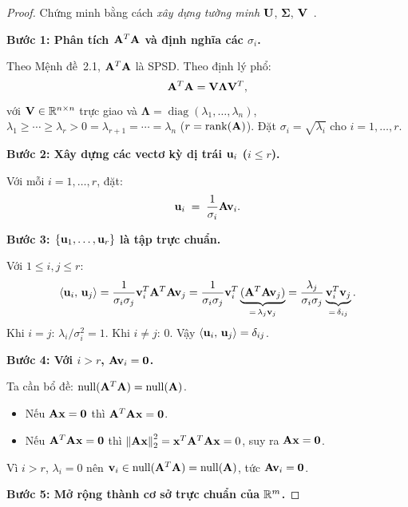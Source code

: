 \begin{proof}
Chứng minh bằng cách \emph{xây dựng tường minh} $\mathbf{U}$, $\boldsymbol{\Sigma}$,
$\mathbf{V}$~\cite{golub2013}.

\medskip
\noindent\textbf{Bước 1: Phân tích $\mathbf{A}^T\mathbf{A}$ và định nghĩa các $\sigma_i$.}

Theo Mệnh đề~2.1, $\mathbf{A}^T\mathbf{A}$ là SPSD. Theo định lý phổ:
\[
    \mathbf{A}^T\mathbf{A} = \mathbf{V}\boldsymbol{\Lambda}\mathbf{V}^T,
\]
với $\mathbf{V} \in \mathbb{R}^{n \times n}$ trực giao và $\boldsymbol{\Lambda} =
\operatorname{diag}(\lambda_1, \ldots, \lambda_n)$, $\lambda_1 \geq \cdots \geq \lambda_r
> 0 = \lambda_{r+1} = \cdots = \lambda_n$ ($r = \operatorname{rank}(\mathbf{A})$).
Đặt $\sigma_i = \sqrt{\lambda_i}$ cho $i = 1, \ldots, r$.

\medskip
\noindent\textbf{Bước 2: Xây dựng các vectơ kỳ dị trái $\mathbf{u}_i$ ($i \leq r$).}

Với mỗi $i = 1, \ldots, r$, đặt:
\[
    \mathbf{u}_i \;=\; \frac{1}{\sigma_i}\mathbf{A}\mathbf{v}_i.
\]

\medskip
\noindent\textbf{Bước 3: $\{\mathbf{u}_1, \ldots, \mathbf{u}_r\}$ là tập trực chuẩn.}

Với $1 \leq i, j \leq r$:
\[
    \langle \mathbf{u}_i,\, \mathbf{u}_j \rangle
    = \frac{1}{\sigma_i\sigma_j}\mathbf{v}_i^T\mathbf{A}^T\mathbf{A}\mathbf{v}_j
    = \frac{1}{\sigma_i\sigma_j}\mathbf{v}_i^T\underbrace{(\mathbf{A}^T\mathbf{A}\mathbf{v}_j)}_{=\,\lambda_j\mathbf{v}_j}
    = \frac{\lambda_j}{\sigma_i\sigma_j}\underbrace{\mathbf{v}_i^T\mathbf{v}_j}_{=\,\delta_{ij}}.
\]
Khi $i = j$: $\lambda_i/\sigma_i^2 = 1$. \quad Khi $i \neq j$: $0$.
Vậy $\langle \mathbf{u}_i,\, \mathbf{u}_j \rangle = \delta_{ij}$.

\medskip
\noindent\textbf{Bước 4: Với $i > r$, $\mathbf{A}\mathbf{v}_i = \mathbf{0}$.}

Ta cần bổ đề: $\operatorname{null}(\mathbf{A}^T\mathbf{A}) = \operatorname{null}(\mathbf{A})$.
\begin{itemize}[noitemsep, topsep=2pt]
    \item[$(\subseteq)$] Nếu $\mathbf{A}\mathbf{x} = \mathbf{0}$ thì $\mathbf{A}^T\mathbf{A}\mathbf{x} = \mathbf{0}$.
    \item[$(\supseteq)$] Nếu $\mathbf{A}^T\mathbf{A}\mathbf{x} = \mathbf{0}$ thì $\left\lVert\mathbf{A}\mathbf{x}\right\rVert_2^2 = \mathbf{x}^T\mathbf{A}^T\mathbf{A}\mathbf{x} = 0$, suy ra $\mathbf{A}\mathbf{x} = \mathbf{0}$.
\end{itemize}
Vì $i > r$, $\lambda_i = 0$ nên $\mathbf{v}_i \in \operatorname{null}(\mathbf{A}^T\mathbf{A}) =
\operatorname{null}(\mathbf{A})$, tức $\mathbf{A}\mathbf{v}_i = \mathbf{0}$.

\medskip
\noindent\textbf{Bước 5: Mở rộng thành cơ sở trực chuẩn của $\mathbb{R}^m$.}


\end{proof}
